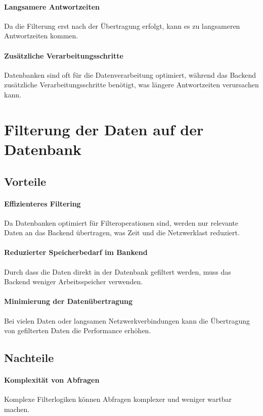 \paragraph{Langsamere Antwortzeiten} Da die Filterung erst nach der Übertragung erfolgt, kann es zu langsameren Antwortzeiten kommen.
\paragraph{Zusätzliche Verarbeitungsschritte} Datenbanken sind oft für die Datenverarbeitung optimiert, während das Backend zusätzliche Verarbeitungsschritte benötigt, was längere Antwortzeiten verursachen kann.

\section{Filterung der Daten auf der Datenbank}

\subsection{Vorteile}
\paragraph{Effizienteres Filtering} Da Datenbanken optimiert für Filteroperationen sind, werden nur relevante Daten an das Backend übertragen, was Zeit und die Netzwerklast reduziert.
\paragraph{Reduzierter Speicherbedarf im Bankend} Durch dass die Daten direkt in der Datenbank gefiltert werden, muss das Backend weniger Arbeitsspeicher verwenden.
\paragraph{Minimierung der Datenübertragung} Bei vielen Daten oder langsamen Netzwerkverbindungen kann die Übertragung von gefilterten Daten die Performance erhöhen.

\subsection{Nachteile}
\paragraph{Komplexität von Abfragen} Komplexe Filterlogiken können Abfragen komplexer und weniger wartbar machen.
